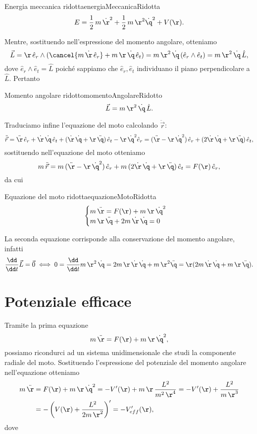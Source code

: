 \begin{remark}{Energia meccanica ridotta}{energiaMeccanicaRidotta}
	\[
		E = \frac{1}{2}\,m\,\dot{\r}^2 + \frac{1}{2}\,m\,\r^2\dot{\q}^2 + V(\r).
	\]
\end{remark}
\noindent
Mentre, sostituendo nell'espressione del momento angolare, otteniamo
\[
	\vec{L} = \r\,\hat{e}_r \wedge (\cancel{m\,\dot{\r}\,\hat{e}_r} + m\,\r\,\dot{\q}\,\hat{e}_t) = m\,\r^2\,\dot{\q}\,(\hat{e}_r \wedge \hat{e}_t) = m\,\r^2\,\dot{\q}\,\hat{L},
\]
dove \(\hat{e}_r \wedge \hat{e}_t=\hat{L}\) poiché sappiamo che \(\hat{e}_r, \hat{e}_t\) individuano il piano perpendicolare a \(\hat{L}\). Pertanto

\begin{remark}{Momento angolare ridotto}{momentoAngolareRidotto}
	\[
		\vec{L} = m\,\r^2\,\dot{\q}\,\hat{L}.
	\]
\end{remark}
\noindent
Traduciamo infine l'equazione del moto calcolando \(\ddot{\vec{r}}\):
\[
	\ddot{\vec{r}} = \ddot{\r}\,\hat{e}_r + \dot{\r}\,\dot{\q}\,\hat{e}_t + (\dot{\r}\,\dot{\q}+\r\,\ddot{\q})\,\hat{e}_t - \r\,\dot{\q}^2 \hat{e}_r = (\ddot{\r}-\r\,\dot{\q}^2)\,\hat{e}_r + (2\dot{\r}\,\dot{\q}+\r\,\ddot{\q})\,\hat{e}_t,
\]
sostituendo nell'equazione del moto otteniamo
\[
	m\,\ddot{\vec{r}} = m\,(\ddot{\r}-\r\,\dot{\q}^2)\,\hat{e}_r + m\,(2\dot{\r}\,\dot{\q}+\r\,\ddot{\q})\,\hat{e}_t = F(\r)\,\hat{e}_r,
\]
da cui

\begin{remark}{Equazione del moto ridotta}{equazioneMotoRidotta}
	\[
		\begin{cases}
			m\,\ddot{\r} = F(\r) + m\,\r\,\dot{\q}^2 \\
			m\,\r\,\ddot{\q} + 2m\,\dot{\r}\,\dot{\q} = 0
		\end{cases}
	\]
\end{remark}

\begin{oss}
	La seconda equazione corrisponde alla conservazione del momento angolare, infatti
	\[
		\frac{\dd}{\dd t}\vec{L} = \vec{0} \iff 0 = \frac{\dd}{\dd t}m\,\r^2\,\dot{\q} = 2m\,\r\,\dot{\r}\,\dot{\q} + m\,\r^2\ddot{\q} = \r(2m\,\dot{\r}\,\dot{\q} + m\,\r\,\ddot{\q}).
	\]
\end{oss}

\section{Potenziale efficace}

Tramite la prima equazione
\[
	m\,\ddot{\r} = F(\r) + m\,\r\,\dot{\q}^2,
\]
possiamo ricondurci ad un sistema unidimensionale che studi la componente radiale del moto.
Sostituendo l'espressione del potenziale del momento angolare nell'equazione otteniamo
\[
	\begin{split}
		m\,\ddot{\r} & = F(\r) + m\,\r\,\dot{\q}^2 = -V'(\r) + m\,\r\, \frac{L^2}{m^2\,\r^4} = -V'(\r) + \frac{L^2}{m\,\r^3}\\
		& = -\left( V(\r) + \frac{L^2}{2m\,\r^2} \right)' = -V_{eff}'(\r),
	\end{split}
\]
dove

